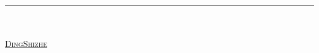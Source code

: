 
\newcommand*{\plogo}{\FiveFlowerOpen}

\newcommand{\Author}{\href{https://github.com/DingShizhe}{DingShizhe}}
\newcommand\myquotepage[3]{\thispagestyle{empty}\vspace*{\fill}\vspace*{\fill}\textcolor{#1}{\textit{#2\\\rightline{#3}}}\vspace*{\fill}\vspace*{\fill}\vspace*{\fill}}

\begin{titlepage}
	\raggedleft
	\rule{1pt}{\textheight} %
	\hspace{0.06\textwidth}
	\parbox[b]{0.80\textwidth}{
		{
            {\fontsize{40}{50}\selectfont
            }
        }\\[2\baselineskip] %
		\textcolor{by}{\large{}}\\[4\baselineskip]{\large\textsc{\Author}}
        
		\vspace{0.5\textheight}
		\color{Sienna}{\noindent 且慢~\plogo}\\[\baselineskip]
	}
    
\end{titlepage}